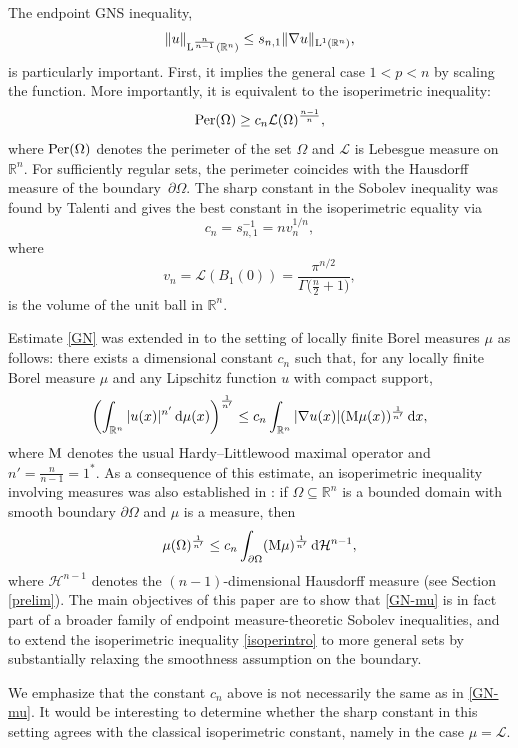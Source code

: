 \documentclass[11pt, a4paper, reqno]{amsart}
\newcommand{\R}{\mathbb R}
\newcommand{\Haus}{\mathcal H }
\newcommand{\dx}{\,{\mathrm dx}}
\newcommand{\dmu}{\,{\mathrm d\mu}}
\newcommand{\Lup}{\textup{L}}
\newcommand{\Leb}{\mathcal{L}}
\DeclareMathOperator{\Per}{\textup{Per}}
\theoremstyle{definition}
\theoremstyle{remark}
\begin{document}
The endpoint GNS inequality,
\begin{equation}\label{GN}
\|u\|_{\Lup^{\frac{n}{n-1}}(\R^n)} \le s_{n,1} \|\nabla u\|_{\Lup^1(\R^n)},
\end{equation}
is particularly important. First, it implies the general case $1<p<n$ by scaling the function. More importantly, it is equivalent to the isoperimetric inequality:
\[
\Per(\Omega) \ge c_n \Leb(\Omega)^{\frac{n-1}{n}},
\]
where $\Per(\Omega)$ denotes the perimeter of the set $\Omega$ and $\mathcal L$ is Lebesgue measure on $\R^n$.  
For sufficiently regular sets, the perimeter coincides with the Hausdorff measure of the boundary~$\partial \Omega$.
The sharp constant in the Sobolev inequality was found by Talenti \cite{Tal} and gives the best constant in the isoperimetric equality via 
\[
c_n = s_{n,1}^{-1} = n v_n^{1/n},
\]
where 
\[
v_n = \Leb(B_1(0)) = \frac{\pi^{n/2}}{\Gamma\big(\frac{n}{2}+1\big)},
\]
is the volume of the unit ball in $\R^n$.


Estimate \eqref{GN} was extended in \cite{PR2} to the setting of locally finite Borel measures $\mu$ as follows: there exists a dimensional constant $c_n$ such that, for any locally finite Borel measure $\mu$ and any Lipschitz function $u$ with compact support,
\begin{equation}\label{GN-mu}
\left(\int_{\mathbb{R}^n} |u(x)|^{n'}\dmu(x) \right)^{\frac1{n'}}
\leq c_n \int_{\mathbb{R}^n} |\nabla u(x)| (\textup{M}\mu(x))^\frac{1}{n'}\dx,
\end{equation}
where $\textup{M}$ denotes the usual Hardy--Littlewood maximal operator and $n'=\frac{n}{n-1}=1^*$. As a consequence of this estimate, an isoperimetric inequality involving measures was also established in \cite{PR2}: if $\Omega \subseteq \mathbb{R}^n$ is a bounded domain with smooth boundary $\partial \Omega$ and $\mu$ is a measure, then
\begin{equation}\label{isoperintro}
\mu(\Omega)^{\frac{1}{n'}} \leq c_n \int_{\partial \Omega} (\textup{M}\mu)^\frac{1}{n'} \, \mathrm{d}\mathcal H^{n-1},
\end{equation}
where $\Haus^{n-1}$ denotes the $(n-1)$-dimensional Hausdorff measure (see Section \ref{prelim}). The main objectives of this paper are to show that \eqref{GN-mu} is in fact part of a broader family of endpoint measure-theoretic Sobolev inequalities, and to extend the isoperimetric inequality \eqref{isoperintro} to more general sets by substantially relaxing the smoothness assumption on the boundary.

We emphasize that the constant $c_n$ above is not necessarily the same as in \eqref{GN-mu}. It would be interesting to determine whether the sharp constant in this setting agrees with the classical isoperimetric constant, namely in the case $\mu=\Leb$.
\end{document}
